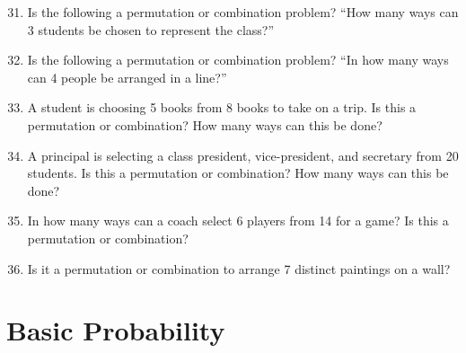 \documentclass[12pt]{article}
\begin{document}
\begin{enumerate}
\setcounter{enumi}{30}

\item Is the following a permutation or combination problem? ``How many ways can 3 students be chosen to represent the class?''

\item Is the following a permutation or combination problem? ``In how many ways can 4 people be arranged in a line?''

\item A student is choosing 5 books from 8 books to take on a trip. Is this a permutation or combination? How many ways can this be done?

\item A principal is selecting a class president, vice-president, and secretary from 20 students. Is this a permutation or combination? How many ways can this be done?

\item In how many ways can a coach select 6 players from 14 for a game? Is this a permutation or combination?

\item Is it a permutation or combination to arrange 7 distinct paintings on a wall?

\end{enumerate}

\section{Basic Probability}
\end{document}
